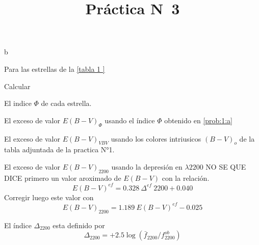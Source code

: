 \documentclass[12pt,a4paper]{practice}
\begin{document}
    \title{Práctica N\textdegree\ 3}b
    \maketitle


    \begin{problem}\label{prob:1}
    Para las estrellas de la \ref{tabla 1 }
    \end{problem}

        Calcular
            \begin{ppart}\label{prob:1:a}
            El indice $\Phi$ de cada estrella.
            \end{ppart}

            \begin{ppart}\label{prob:1:b}
            El exceso de valor $E(B-V)_{\Phi}$ usando el índice $\Phi$ obtenido en \ref{prob:1:a}
            \end{ppart}

            \begin{ppart}\label{prob:1:c}
            El exceso de valor $E(B-V)_{VBV}$ usando los colores intriusicos $(B-V)_{o}$ de la tabla adjuntada de la practica N°1.
            \end{ppart}

            \begin{ppart}\label{prob:1:d}
            El exceso de valor $E(B-V)_{2200}$ usando la depresión en $\lambda 2200$  NO SE QUE DICE primero un valor aroximado de $E(B-V)$ con la relación.
            $$
            E(B-V)^{ef} = 0.328\  \Delta ^{ef}\ 2200 + 0.040
            $$
            Corregir luego este valor con
            $$
            E(B-V)_{2200} = 1.189\  E(B-V)^{ef}- 0.025
            $$

            El índice $\Delta _{2200}$ esta definido por
             $$
             \Delta _{2200} = +2.5 \log \left(\bar{f}_{2200}/f_{2200}^{ob}\right)

             $$

            \end{ppart}
\end{document}

